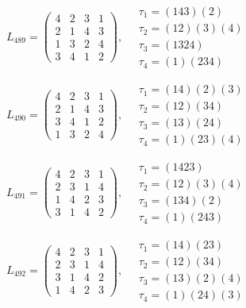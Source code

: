 $L_{489} = \begin{pmatrix} 4 & 2 & 3 & 1 \\ 2 & 1 & 4 & 3 \\ 1 & 3 & 2 & 4 \\ 3 & 4 & 1 & 2 \end{pmatrix}, \quad \begin{matrix} \tau_{1} = (1 4 3)(2) \\ \tau_{2} = (1 2)(3)(4) \\ \tau_{3} = (1 3 2 4) \\ \tau_{4} = (1)(2 3 4) \end{matrix}$

$L_{490} = \begin{pmatrix} 4 & 2 & 3 & 1 \\ 2 & 1 & 4 & 3 \\ 3 & 4 & 1 & 2 \\ 1 & 3 & 2 & 4 \end{pmatrix}, \quad \begin{matrix} \tau_{1} = (1 4)(2)(3) \\ \tau_{2} = (1 2)(3 4) \\ \tau_{3} = (1 3)(2 4) \\ \tau_{4} = (1)(2 3)(4) \end{matrix}$

$L_{491} = \begin{pmatrix} 4 & 2 & 3 & 1 \\ 2 & 3 & 1 & 4 \\ 1 & 4 & 2 & 3 \\ 3 & 1 & 4 & 2 \end{pmatrix}, \quad \begin{matrix} \tau_{1} = (1 4 2 3) \\ \tau_{2} = (1 2)(3)(4) \\ \tau_{3} = (1 3 4)(2) \\ \tau_{4} = (1)(2 4 3) \end{matrix}$

$L_{492} = \begin{pmatrix} 4 & 2 & 3 & 1 \\ 2 & 3 & 1 & 4 \\ 3 & 1 & 4 & 2 \\ 1 & 4 & 2 & 3 \end{pmatrix}, \quad \begin{matrix} \tau_{1} = (1 4)(2 3) \\ \tau_{2} = (1 2)(3 4) \\ \tau_{3} = (1 3)(2)(4) \\ \tau_{4} = (1)(2 4)(3) \end{matrix}$

